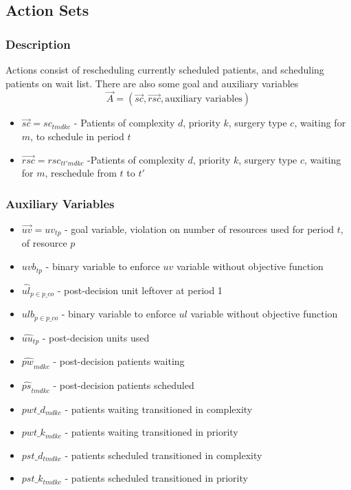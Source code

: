 \subsection{Action Sets}
\subsubsection{Description}
Actions consist of rescheduling currently scheduled patients, and scheduling patients on wait list. There are also some goal and auxiliary variables
\[  \vec{A} = (\vec{sc}, \vec{rsc}, \text{auxiliary variables}) \] 
\begin{itemize}
	\item $\vec{sc} = sc_{tmdkc}$ - Patients of complexity $d$, priority $k$,  surgery type $c$, waiting for $m$, to schedule in period $t$
	\item $\vec{rsc} = rsc_{tt'mdkc}$ -Patients of complexity $d$, priority $k$, surgery type $c$, waiting for $m$, reschedule from $t$ to $t'$
\end{itemize}

\subsubsection{Auxiliary Variables}
\begin{itemize}
	\item $\vec{uv} = uv_{tp}$ - goal variable, violation on number of resources used for period $t$, of resource $p$
	\item $uvb_{tp}$ - binary variable to enforce $uv$ variable without objective function
	\item $\hat{ul}_{p \in p\_co}$ - post-decision unit leftover at period 1
	\item $ulb_{p \in p\_co}$ - binary variable to enforce $ul$ variable without objective function
	\item $\hat{uu}_{tp}$ - post-decision units used
	\item $\hat{pw}_{mdkc}$ - post-decision patients waiting
	\item $\hat{ps}_{tmdkc}$ - post-decision patients scheduled
	\item $pwt\_d_{mdkc}$ - patients waiting transitioned in complexity
	\item $pwt\_k_{mdkc}$ - patients waiting transitioned in priority
	\item $pst\_d_{tmdkc}$ - patients scheduled transitioned in complexity
	\item $pst\_k_{tmdkc}$ - patients scheduled transitioned in priority
\end{itemize}
